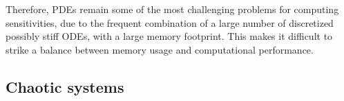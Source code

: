 Therefore, PDEs remain some of the most challenging problems for computing sensitivities, due to the frequent combination of a large number of discretized possibly stiff ODEs, with a large memory footprint. 
This makes it difficult to strike a balance between memory usage and computational performance.




\subsection{Chaotic systems}


